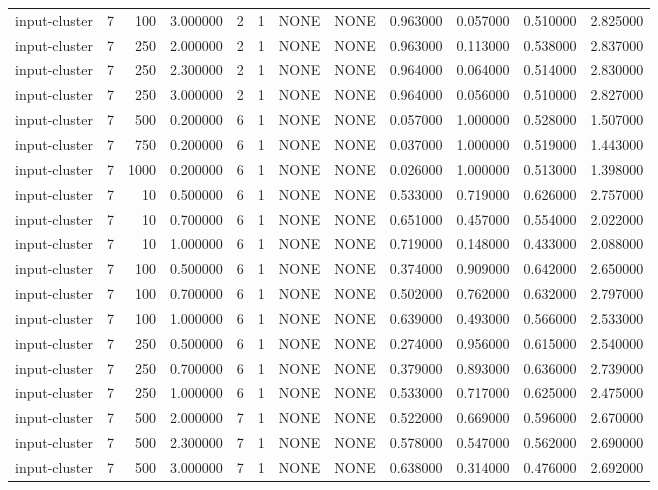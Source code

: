 \begin{tabular}{lrrrllllrrrr}
input-cluster & 7 & 100 & 3.000000 & 2 & 1 & NONE & NONE & 0.963000 & 0.057000 & 0.510000 & 2.825000 \\
input-cluster & 7 & 250 & 2.000000 & 2 & 1 & NONE & NONE & 0.963000 & 0.113000 & 0.538000 & 2.837000 \\
input-cluster & 7 & 250 & 2.300000 & 2 & 1 & NONE & NONE & 0.964000 & 0.064000 & 0.514000 & 2.830000 \\
input-cluster & 7 & 250 & 3.000000 & 2 & 1 & NONE & NONE & 0.964000 & 0.056000 & 0.510000 & 2.827000 \\
input-cluster & 7 & 500 & 0.200000 & 6 & 1 & NONE & NONE & 0.057000 & 1.000000 & 0.528000 & 1.507000 \\
input-cluster & 7 & 750 & 0.200000 & 6 & 1 & NONE & NONE & 0.037000 & 1.000000 & 0.519000 & 1.443000 \\
input-cluster & 7 & 1000 & 0.200000 & 6 & 1 & NONE & NONE & 0.026000 & 1.000000 & 0.513000 & 1.398000 \\
input-cluster & 7 & 10 & 0.500000 & 6 & 1 & NONE & NONE & 0.533000 & 0.719000 & 0.626000 & 2.757000 \\
input-cluster & 7 & 10 & 0.700000 & 6 & 1 & NONE & NONE & 0.651000 & 0.457000 & 0.554000 & 2.022000 \\
input-cluster & 7 & 10 & 1.000000 & 6 & 1 & NONE & NONE & 0.719000 & 0.148000 & 0.433000 & 2.088000 \\
input-cluster & 7 & 100 & 0.500000 & 6 & 1 & NONE & NONE & 0.374000 & 0.909000 & 0.642000 & 2.650000 \\
input-cluster & 7 & 100 & 0.700000 & 6 & 1 & NONE & NONE & 0.502000 & 0.762000 & 0.632000 & 2.797000 \\
input-cluster & 7 & 100 & 1.000000 & 6 & 1 & NONE & NONE & 0.639000 & 0.493000 & 0.566000 & 2.533000 \\
input-cluster & 7 & 250 & 0.500000 & 6 & 1 & NONE & NONE & 0.274000 & 0.956000 & 0.615000 & 2.540000 \\
input-cluster & 7 & 250 & 0.700000 & 6 & 1 & NONE & NONE & 0.379000 & 0.893000 & 0.636000 & 2.739000 \\
input-cluster & 7 & 250 & 1.000000 & 6 & 1 & NONE & NONE & 0.533000 & 0.717000 & 0.625000 & 2.475000 \\
input-cluster & 7 & 500 & 2.000000 & 7 & 1 & NONE & NONE & 0.522000 & 0.669000 & 0.596000 & 2.670000 \\
input-cluster & 7 & 500 & 2.300000 & 7 & 1 & NONE & NONE & 0.578000 & 0.547000 & 0.562000 & 2.690000 \\
input-cluster & 7 & 500 & 3.000000 & 7 & 1 & NONE & NONE & 0.638000 & 0.314000 & 0.476000 & 2.692000 \\

\end{tabular}
